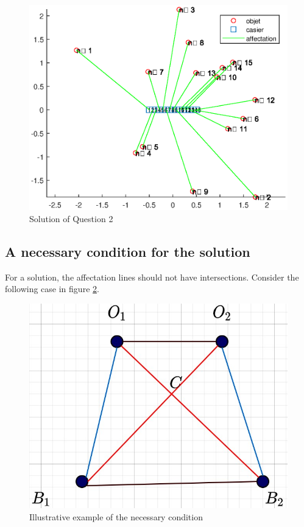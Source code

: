 \documentclass{CSArticle}[english]
\begin{document}
\begin{figure}[ht]
\centering
\includegraphics[scale=0.6]{figure/Q2.eps}
\caption{Solution of Question 2}
\label{fig:Q2}
\end{figure}



\subsection{A necessary condition for the solution}
For a solution, the affectation lines should not have intersections. Consider the following case in figure \ref{fig:Q2-nece}.

\begin{figure}[ht]
\centering
\includegraphics[scale=0.25]{figure/Q2-nece.jpg}
\caption{Illustrative example of the necessary condition}
\label{fig:Q2-nece}
\end{figure}
\end{document}
